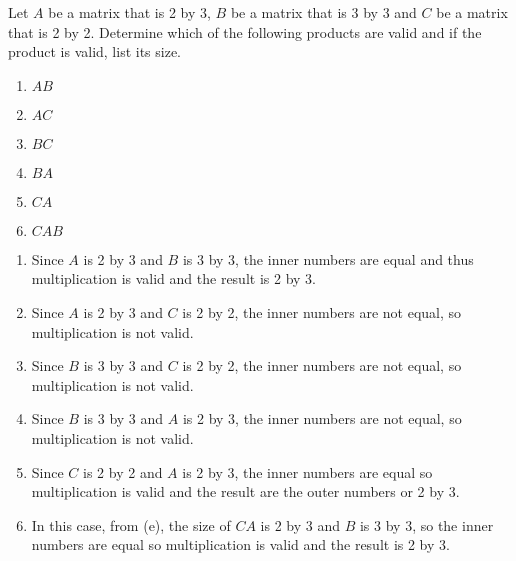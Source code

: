 \begin{example}
Let $A$ be a matrix that is 2 by 3, $B$ be a matrix that is 3 by 3 and $C$ be a matrix that is 2 by 2.  Determine which of the following products are valid and if the product is valid, list its size.

\begin{multicols}{3}
\begin{enumerate}[label=(\alph*)]
\item $AB$ \item $AC$ \item $BC$
\end{enumerate}

\end{multicols}
\begin{multicols}{3}
\begin{enumerate}[label=(\alph*)]\setcounter{enumi}{3}
\item $BA$ \item $CA$ \item $CAB$
\end{enumerate}

\end{multicols}

\solution

\begin{enumerate}[label=(\alph*)]
\item Since $A$ is 2 by 3 and $B$ is 3 by 3, the inner numbers are equal and thus multiplication is valid and the result is 2 by 3.

\item Since $A$ is 2 by 3 and $C$ is 2 by 2, the inner numbers are not equal, so multiplication is not valid.

\item Since $B$ is 3 by 3 and $C$ is 2 by 2, the inner numbers are not equal, so multiplication is not valid.

\item Since $B$ is 3 by 3 and $A$ is 2 by 3, the inner numbers are not equal, so multiplication is not valid.

\item Since $C$ is 2 by 2 and $A$ is 2 by 3, the inner numbers are equal so multiplication is valid and the result are the outer numbers or 2 by 3.

\item In this case, from (e), the size of $CA$ is 2 by 3 and $B$ is 3 by 3, so the inner numbers are equal so multiplication is valid and the result is 2 by 3.

\end{enumerate}


\end{example}

